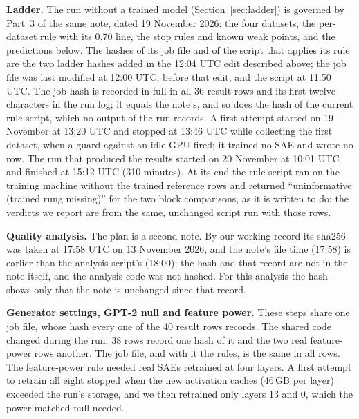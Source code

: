 \documentclass[10pt,twocolumn]{article}
\begin{document}
\textbf{Ladder.} The run without a trained model (Section~\ref{sec:ladder}) is governed by Part~3 of the same note, dated 19 November 2026: the four datasets, the per-dataset rule with its 0.70 line, the stop rules and known weak points, and the predictions below. The hashes of its job file and of the script that applies its rule are the two ladder hashes added in the 12:04 UTC edit described above; the job file was last modified at 12:00 UTC, before that edit, and the script at 11:50 UTC. The job hash is recorded in full in all 36 result rows and its first twelve characters in the run log; it equals the note's, and so does the hash of the current rule script, which no output of the run records. A first attempt started on 19 November at 13:20 UTC and stopped at 13:46 UTC while collecting the first dataset, when a guard against an idle GPU fired; it trained no SAE and wrote no row. The run that produced the results started on 20 November at 10:01 UTC and finished at 15:12 UTC (310 minutes). At its end the rule script ran on the training machine without the trained reference rows and returned ``uninformative (trained rung missing)'' for the two block comparisons, as it is written to do; the verdicts we report are from the same, unchanged script run with those rows.

\textbf{Quality analysis.} The plan is a second note. By our working record its sha256 was taken at 17:58 UTC on 13 November 2026, and the note's file time (17:58) is earlier than the analysis script's (18:00); the hash and that record are not in the note itself, and the analysis code was not hashed. For this analysis the hash shows only that the note is unchanged since that record.

\textbf{Generator settings, GPT-2 null and feature power.} These steps share one job file, whose hash every one of the 40 result rows records. The shared code changed during the run: 38 rows record one hash of it and the two real feature-power rows another. The job file, and with it the rules, is the same in all rows. The feature-power rule needed real SAEs retrained at four layers. A first attempt to retrain all eight stopped when the new activation caches (46\,GB per layer) exceeded the run's storage, and we then retrained only layers 13 and 0, which the power-matched null needed.
\end{document}
